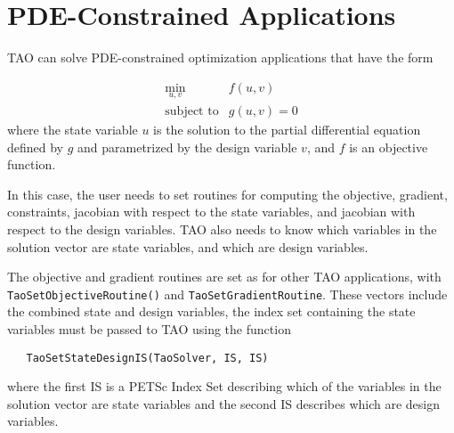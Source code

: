 \begin{comment}
The computation of the Jacobian of the separable objective routine 
should be in a routine that looks like
\begin{verbatim}
   PetscErrorCode EvaluateJacobian(TaoSolver,Vec,Mat*,Mat*,MatStructure*,
                     void*);
\end{verbatim}
This function can be registered with TAO using the function
\begin{verbatim}
   TaoSetJacobianRoutine(TaoSolver,Mat J, Mat Jpre,
                     PetscErrorCode (*)(TaoSolver,Vec,Mat*,Mat*,
                     MatStructure*,void*), void *);
\end{verbatim}
The first argument is the TAO solver object, the second and third arguments
are the Mat object where the Jacobian will be stored and the Mat object
that will be used for the preconditioning (they may be the same). The fourth 
argument is the function that evaluates the Jacobian, 
and the fifth argument is a pointer to a user defined context,
cast as a {\tt void*} pointer.
\end{comment}

\section{PDE-Constrained Applications}\label{sec:pde_applications}
TAO can solve PDE-constrained optimization applications 
that have the form

\[
\begin{array}{ll}
\displaystyle \min_{u,v} & f(u,v) \\
\mbox{subject to} & g(u,v) = 0
\end{array}
\]
where the state variable $u$ is the solution to the partial differential 
equation defined by $g$ and parametrized by the design variable $v$, and 
$f$ is an objective function.  


In this case, the user needs to set routines for computing the objective,
gradient, constraints, jacobian with respect to the state variables, 
and jacobian with
respect to the design variables.  TAO also needs to know which variables
in the solution vector are state variables, and which are design variables.

The objective and gradient routines are set as for other TAO applications,
with {\tt Tao\-Set\-Object\-ive\-Routine()} and {\tt Tao\-Set\-Gradient\-Routine}.
These vectors include the combined state and design variables, the index set
containing the state variables must be passed to TAO using the function
\begin{verbatim}
   TaoSetStateDesignIS(TaoSolver, IS, IS)
\end{verbatim}
where the first IS is a PETSc Index Set describing which of the variables in the 
solution vector are state variables and the second IS describes which are
design variables.

